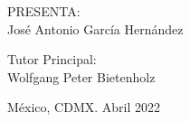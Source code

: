 \begin{titlepage}
\begin{center}
\begin{center}
				\begin{center}
					\sc PRESENTA: \\
					\Large José Antonio García Hernández
				\end{center}
				
				
				Tutor Principal: \\
				Wolfgang Peter Bietenholz\\
			\end{center}
			
			
			\begin{center}
				{México, CDMX. Abril 2022}\\
			\end{center}
			\cleardoublepage
		\end{center}
	\end{titlepage}
%
